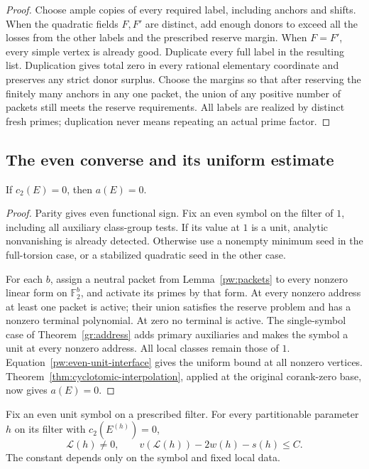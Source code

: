 \begin{proof}
Choose ample copies of every required label, including anchors and shifts.
When the quadratic fields $F,F'$ are distinct, add enough donors to
exceed all the losses from the other labels and the prescribed reserve
margin. When $F=F'$, every simple vertex is already good. Duplicate every
full label in the resulting list.  Duplication gives total zero in every
rational elementary coordinate and preserves any strict donor surplus.
Choose the margins so that after reserving the finitely many anchors in
any one packet, the union of any positive number of packets still meets
the reserve requirements.  All labels are realized by distinct fresh
primes; duplication never means repeating an actual prime factor.
\end{proof}

\subsection{The even converse and its uniform estimate}
\label{pw:lower-section}

\begin{proposition}\label{pw:even-base}
If $c_2(E)=0$, then $a(E)=0$.
\end{proposition}

\begin{proof}
Parity gives even functional sign.  Fix an even symbol on the filter of $1$,
including all auxiliary class-group tests.  If its value at $1$ is a
unit, analytic nonvanishing is already detected.  Otherwise use a
nonempty minimum seed in the full-torsion case, or a stabilized quadratic
seed in the other case.

For each $b$, assign a neutral packet from Lemma~\ref{pw:packets} to
every nonzero linear form on $\mathbb F_2^b$, and activate its primes
by that form.  At every nonzero address at least one packet is active;
their union satisfies the reserve problem and has a nonzero terminal
polynomial.  At zero no terminal is active.  The single-symbol case of
Theorem~\ref{gr:address} adds primary auxiliaries and makes the symbol a
unit at every nonzero address.  All local classes remain those of $1$.
Equation~\eqref{pw:even-unit-interface} gives the uniform bound at all
nonzero vertices.  Theorem~\ref{thm:cyclotomic-interpolation}, applied
at the original corank-zero base, now gives $a(E)=0$.
\end{proof}

\begin{proposition}\label{pw:partitionable-even}
Fix an even unit symbol on a prescribed filter.  For every
partitionable parameter $h$ on its filter with $c_2(E^{(h)})=0$,
\begin{equation}\label{pw:partitionable-bound}
 \mathcal L(h)\ne0,\qquad v(\mathcal L(h))-2w(h)-s(h)\le C.
\end{equation}
The constant depends only on the symbol and fixed local data.
\end{proposition}

